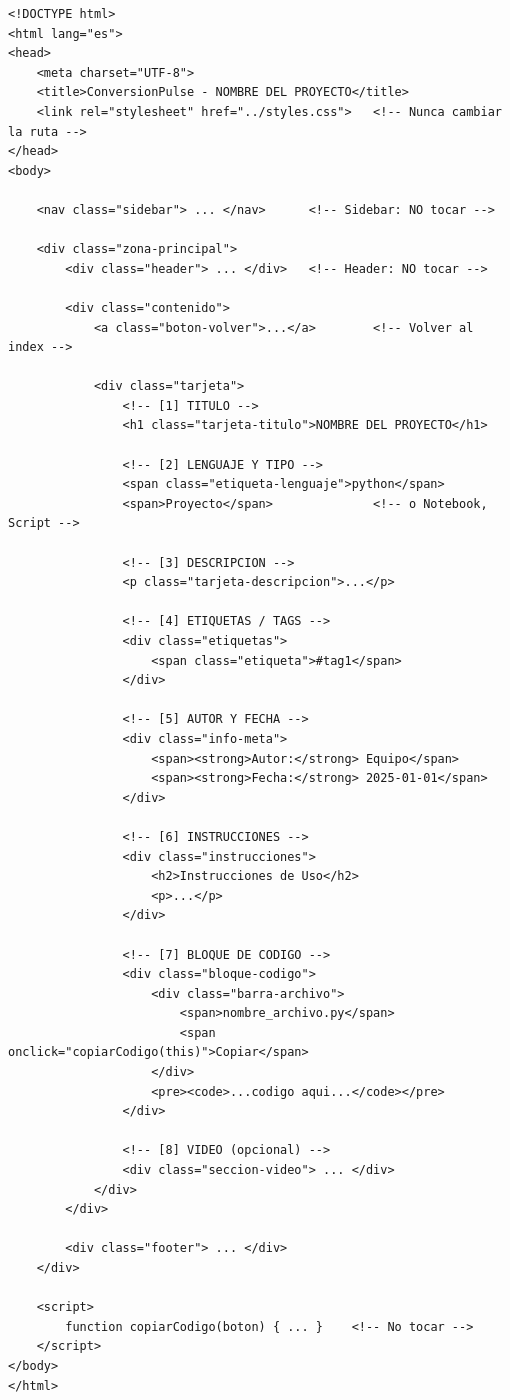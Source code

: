 \documentclass[12pt, a4paper]{article}
\begin{document}
\begin{lstlisting}[style=htmlstyle, caption={Esqueleto de una página de código}]
<!DOCTYPE html>
<html lang="es">
<head>
    <meta charset="UTF-8">
    <title>ConversionPulse - NOMBRE DEL PROYECTO</title>
    <link rel="stylesheet" href="../styles.css">   <!-- Nunca cambiar la ruta -->
</head>
<body>

    <nav class="sidebar"> ... </nav>      <!-- Sidebar: NO tocar -->

    <div class="zona-principal">
        <div class="header"> ... </div>   <!-- Header: NO tocar -->

        <div class="contenido">
            <a class="boton-volver">...</a>        <!-- Volver al index -->

            <div class="tarjeta">
                <!-- [1] TITULO -->
                <h1 class="tarjeta-titulo">NOMBRE DEL PROYECTO</h1>

                <!-- [2] LENGUAJE Y TIPO -->
                <span class="etiqueta-lenguaje">python</span>
                <span>Proyecto</span>              <!-- o Notebook, Script -->

                <!-- [3] DESCRIPCION -->
                <p class="tarjeta-descripcion">...</p>

                <!-- [4] ETIQUETAS / TAGS -->
                <div class="etiquetas">
                    <span class="etiqueta">#tag1</span>
                </div>

                <!-- [5] AUTOR Y FECHA -->
                <div class="info-meta">
                    <span><strong>Autor:</strong> Equipo</span>
                    <span><strong>Fecha:</strong> 2025-01-01</span>
                </div>

                <!-- [6] INSTRUCCIONES -->
                <div class="instrucciones">
                    <h2>Instrucciones de Uso</h2>
                    <p>...</p>
                </div>

                <!-- [7] BLOQUE DE CODIGO -->
                <div class="bloque-codigo">
                    <div class="barra-archivo">
                        <span>nombre_archivo.py</span>
                        <span onclick="copiarCodigo(this)">Copiar</span>
                    </div>
                    <pre><code>...codigo aqui...</code></pre>
                </div>

                <!-- [8] VIDEO (opcional) -->
                <div class="seccion-video"> ... </div>
            </div>
        </div>

        <div class="footer"> ... </div>
    </div>

    <script>
        function copiarCodigo(boton) { ... }    <!-- No tocar -->
    </script>
</body>
</html>
\end{lstlisting}
\end{document}
